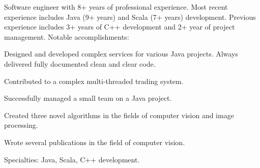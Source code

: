 

\begin{cvparagraph}
	Software engineer with 8+ years of professional experience. Most recent experience includes Java (9+ years) and Scala (7+ years) development. Previous experience includes 3+ years of C++ development and 2+ year of project management. Notable accomplishments:
      \begin{cvitems}
      \item{Designed and developed complex services for various Java projects. Always delivered fully documented clean and clear code.}
      \item{Contributed to a complex multi-threaded trading system.}
      \item{Successfully managed a small team on a Java project.}
      \item{Created three novel algorithms in the fields of computer vision and image processing.}
      \item{Wrote several publications in the field of computer vision.}
      \end{cvitems}
      Specialties: Java, Scala, C++ development.
\end{cvparagraph}
